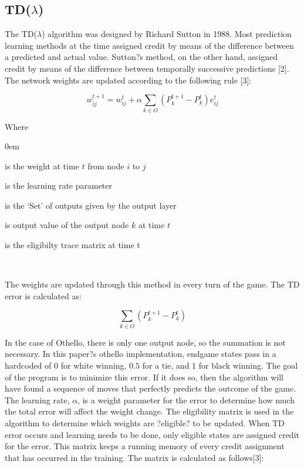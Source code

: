 \documentclass{sig-alternate-05-2015}
\begin{document}
\subsection{TD(\(\lambda\))}

	The TD(\(\lambda\)) algorithm was designed by Richard Sutton in 1988. Most prediction learning methods at the time assigned credit by means of the difference between a predicted and actual value. Sutton?s method, on the other hand, assigned credit by means of the difference between temporally successive predictions [2]. The network weights are updated according to the following rule [3]:
	
\begin{equation}
w_{ij}^{t+1} = w_{ij}^t + \alpha  \sum\limits_{k\in O} (P_k^{t+1} - P_k^{t}) e_{ij}^t 
\end{equation}

Where
\begin{description}
\itemsep0em 
\item [w_{ij}^{t+1}] is the weight at time $t$ from node $i$ to $j$
\item[\alpha] is the learning rate parameter
\item[O] is the `Set' of outputs given by the output layer
\item[P_k^{t}] is output value of the output node $k$ at time $t$
\item[e_{ij}^t] is the eligibilty trace matrix at time t
\end{description} 
\
	
The weights are updated through this method in every turn of the game. The TD error is calculated as: 

\begin{equation}
 \sum\limits_{k \in O} (P_k^{t+1} - P_k^t)
\end{equation}

In the case of Othello, there is only one output node, so the summation is not necessary. In this paper?s othello implementation, endgame states pass in a hardcoded of $0$ for white winning, $0.5$ for a tie, and $1$ for black winning. The goal of the program is to minimize this error. If it does so, then the algorithm will have found a sequence of moves that perfectly predicts the outcome of the game. The learning rate, $\alpha$, is a weight parameter for the error to determine how much the total error will affect the weight change. The eligibility matrix is used in the algorithm to determine which weights are ?eligible? to be updated. When TD error occurs and learning needs to be done, only eligible states are assigned credit for the error. This matrix keeps a running memory of every credit assignment that has occurred in the training. The matrix is calculated as follows[3]:
\end{document}

